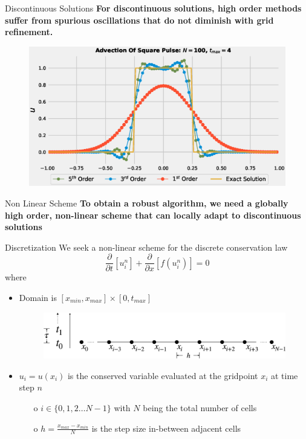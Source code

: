 \documentclass[10pt]{beamer}
\begin{document}
\begin{frame}{Discontinuous Solutions}
  \centering
  \textbf{For discontinuous solutions, high order methods suffer from spurious oscillations that do not diminish with grid refinement.}
  
  \begin{figure}[H]
    \centering
    \includegraphics[scale=0.5]{AdvectionHighOrderComparison_pulse.eps}
    \end{figure}
\end{frame}

\begin{frame}{Non Linear Scheme}
  \textbf{To obtain a robust algorithm, we need a globally high order, non-linear scheme that can locally adapt to discontinuous solutions}
\end{frame}


\begin{frame}{Discretization}
  We seek a non-linear scheme for the discrete conservation law
  \begin{equation}
    \frac{\partial}{\partial t}[u_i^n] + \frac{\partial}{\partial x}[f(u_i^n)] = 0
  \end{equation}
  where 
  \begin{itemize}
    \item Domain is $[x_{min},x_{max}] \times [0,t_{max}]$
    \begin{figure}[H]
      \centering
      \includegraphics[scale=0.175]{GridGraphic_time.png}
    \end{figure}
    \item $u_i = u(x_i)$ is the conserved variable evaluated at the gridpoint $x_i$ at time step $n$
    \begin{itemize}
      \item[o]  $i \in \{0,1,2 \dots N-1\}$ with $N$ being the total number of cells
      \item[o] $h = \frac{x_{max} - x_{min}}{N}$ is the step size in-between adjacent cells
    \end{itemize}
  \end{itemize}
\end{frame}
\end{document}

